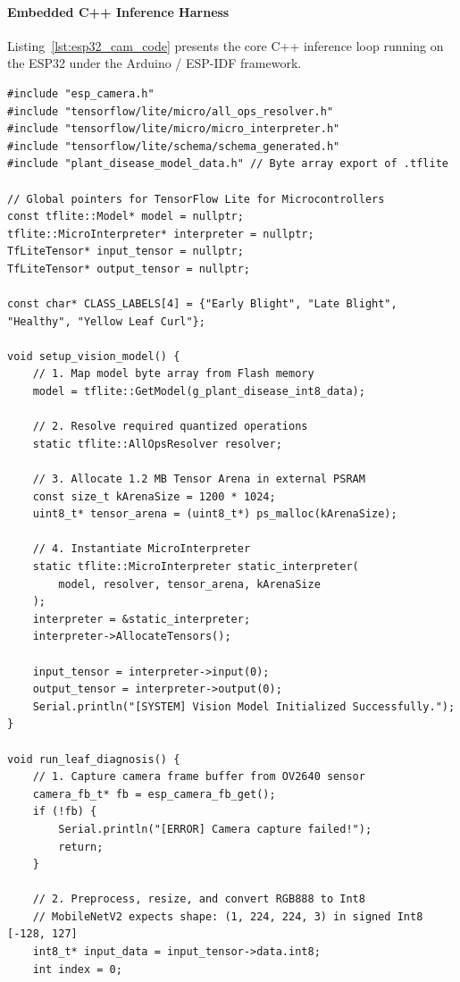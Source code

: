 \paragraph{Embedded C++ Inference Harness}
Listing~\ref{lst:esp32_cam_code} presents the core C++ inference loop running on the ESP32 under the Arduino / ESP-IDF framework.

\begin{lstlisting}[style=pythonstyle, caption={ESP32-CAM C++ Inference Loop with Image Preprocessing and TFLM.}, label={lst:esp32_cam_code}]
#include "esp_camera.h"
#include "tensorflow/lite/micro/all_ops_resolver.h"
#include "tensorflow/lite/micro/micro_interpreter.h"
#include "tensorflow/lite/schema/schema_generated.h"
#include "plant_disease_model_data.h" // Byte array export of .tflite

// Global pointers for TensorFlow Lite for Microcontrollers
const tflite::Model* model = nullptr;
tflite::MicroInterpreter* interpreter = nullptr;
TfLiteTensor* input_tensor = nullptr;
TfLiteTensor* output_tensor = nullptr;

const char* CLASS_LABELS[4] = {"Early Blight", "Late Blight", "Healthy", "Yellow Leaf Curl"};

void setup_vision_model() {
    // 1. Map model byte array from Flash memory
    model = tflite::GetModel(g_plant_disease_int8_data);
    
    // 2. Resolve required quantized operations
    static tflite::AllOpsResolver resolver;
    
    // 3. Allocate 1.2 MB Tensor Arena in external PSRAM
    const size_t kArenaSize = 1200 * 1024;
    uint8_t* tensor_arena = (uint8_t*) ps_malloc(kArenaSize);
    
    // 4. Instantiate MicroInterpreter
    static tflite::MicroInterpreter static_interpreter(
        model, resolver, tensor_arena, kArenaSize
    );
    interpreter = &static_interpreter;
    interpreter->AllocateTensors();
    
    input_tensor = interpreter->input(0);
    output_tensor = interpreter->output(0);
    Serial.println("[SYSTEM] Vision Model Initialized Successfully.");
}

void run_leaf_diagnosis() {
    // 1. Capture camera frame buffer from OV2640 sensor
    camera_fb_t* fb = esp_camera_fb_get();
    if (!fb) {
        Serial.println("[ERROR] Camera capture failed!");
        return;
    }
    
    // 2. Preprocess, resize, and convert RGB888 to Int8
    // MobileNetV2 expects shape: (1, 224, 224, 3) in signed Int8 [-128, 127]
    int8_t* input_data = input_tensor->data.int8;
    int index = 0;
    

\end{lstlisting}
